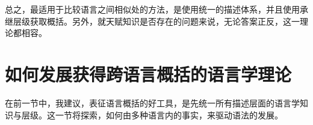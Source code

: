 总之，最适用于比较语言之间相似处的方法，是使用统一的描述体系，并且使用承继层级获取概括。另外，就天赋知识是否存在的问题来说，无论答案正反，这一理论都相容。

\section{如何发展获得跨语言概括的语言学理论}
\label{sec-develop-theories-coregram}

在前一节中，我建议，表征语言概括的好工具，是先统一所有描述层面的语言学知识与层级。这一节将探索，如何由多种语言内的事实，来驱动语法的发展。

